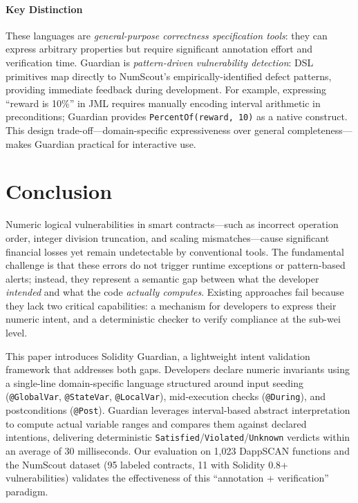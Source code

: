 \documentclass[pdflatex,sn-basic]{sn-jnl}%
\theoremstyle{thmstyleone}%
\theoremstyle{thmstyletwo}%
\theoremstyle{thmstylethree}%
\begin{document}
\paragraph{Key Distinction}
These languages are \textit{general-purpose correctness specification tools}: they can express arbitrary properties but require significant annotation effort and verification time. Guardian is \textit{pattern-driven vulnerability detection}: DSL primitives map directly to NumScout's empirically-identified defect patterns, providing immediate feedback during development. For example, expressing ``reward is 10\%'' in JML requires manually encoding interval arithmetic in preconditions; Guardian provides \texttt{PercentOf(reward, 10)} as a native construct. This design trade-off—domain-specific expressiveness over general completeness—makes Guardian practical for interactive use.


\section{Conclusion}

Numeric logical vulnerabilities in smart contracts—such as incorrect operation order, integer division truncation, and scaling mismatches—cause significant financial losses yet remain undetectable by conventional tools. The fundamental challenge is that these errors do not trigger runtime exceptions or pattern-based alerts; instead, they represent a semantic gap between what the developer \textit{intended} and what the code \textit{actually computes}. Existing approaches fail because they lack two critical capabilities: a mechanism for developers to express their numeric intent, and a deterministic checker to verify compliance at the sub-wei level.

This paper introduces Solidity Guardian, a lightweight intent validation framework that addresses both gaps. Developers declare numeric invariants using a single-line domain-specific language structured around input seeding (\texttt{@GlobalVar}, \texttt{@StateVar}, \texttt{@LocalVar}), mid-execution checks (\texttt{@During}), and postconditions (\texttt{@Post}). Guardian leverages interval-based abstract interpretation to compute actual variable ranges and compares them against declared intentions, delivering deterministic \texttt{Satisfied}/\texttt{Violated}/\texttt{Unknown} verdicts within an average of 30 milliseconds. Our evaluation on 1,023 DappSCAN functions and the NumScout dataset (95 labeled contracts, 11 with Solidity 0.8+ vulnerabilities) validates the effectiveness of this ``annotation + verification'' paradigm.
\end{document}
